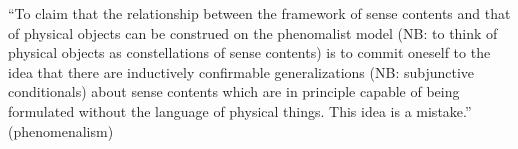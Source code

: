 ``To claim that the relationship between the framework of sense contents and
that of physical objects can be construed on the phenomalist model (NB: to
think of physical objects as constellations of sense contents) is to commit
oneself to the idea that there are inductively confirmable generalizations (NB:
 subjunctive conditionals) about sense contents which are in principle capable
 of being formulated without the language of physical things. This idea is a
 mistake.'' (phenomenalism)
